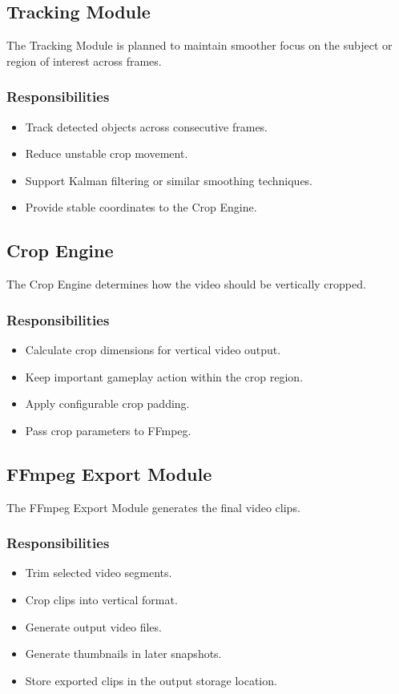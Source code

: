 \documentclass[12pt]{article}
\begin{document}
\subsection{Tracking Module}
The Tracking Module is planned to maintain smoother focus on the subject or region of interest across frames.

\subsubsection*{Responsibilities}
\begin{itemize}[noitemsep]
    \item Track detected objects across consecutive frames.
    \item Reduce unstable crop movement.
    \item Support Kalman filtering or similar smoothing techniques.
    \item Provide stable coordinates to the Crop Engine.
\end{itemize}

\subsection{Crop Engine}
The Crop Engine determines how the video should be vertically cropped.

\subsubsection*{Responsibilities}
\begin{itemize}[noitemsep]
    \item Calculate crop dimensions for vertical video output.
    \item Keep important gameplay action within the crop region.
    \item Apply configurable crop padding.
    \item Pass crop parameters to FFmpeg.
\end{itemize}

\subsection{FFmpeg Export Module}
The FFmpeg Export Module generates the final video clips.

\subsubsection*{Responsibilities}
\begin{itemize}[noitemsep]
    \item Trim selected video segments.
    \item Crop clips into vertical format.
    \item Generate output video files.
    \item Generate thumbnails in later snapshots.
    \item Store exported clips in the output storage location.
\end{itemize}
\end{document}
